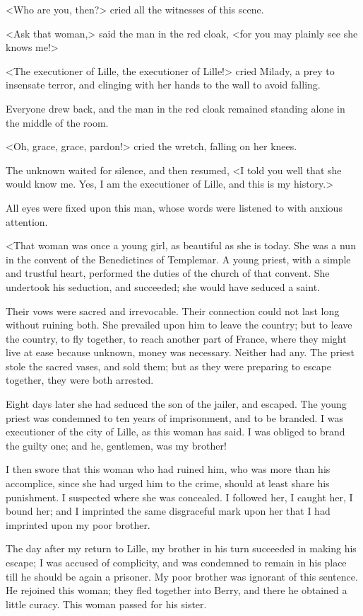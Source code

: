 <Who are you, then?> cried all the witnesses of this scene. 

<Ask that woman,> said the man in the red cloak, <for you may plainly see she knows me!> 

<The executioner of Lille, the executioner of Lille!> cried Milady, a prey to insensate terror, and clinging with her hands to the wall to avoid falling. 

Everyone drew back, and the man in the red cloak remained standing alone in the middle of the room. 

<Oh, grace, grace, pardon!> cried the wretch, falling on her knees. 

The unknown waited for silence, and then resumed, <I told you well that she would know me. Yes, I am the executioner of Lille, and this is my history.> 

All eyes were fixed upon this man, whose words were listened to with anxious attention. 

<That woman was once a young girl, as beautiful as she is today. She was a nun in the convent of the Benedictines of Templemar. A young priest, with a simple and trustful heart, performed the duties of the church of that convent. She undertook his seduction, and succeeded; she would have seduced a saint. 

Their vows were sacred and irrevocable. Their connection could not last long without ruining both. She prevailed upon him to leave the country; but to leave the country, to fly together, to reach another part of France, where they might live at ease because unknown, money was necessary. Neither had any. The priest stole the sacred vases, and sold them; but as they were preparing to escape together, they were both arrested. 

Eight days later she had seduced the son of the jailer, and escaped. The young priest was condemned to ten years of imprisonment, and to be branded. I was executioner of the city of Lille, as this woman has said. I was obliged to brand the guilty one; and he, gentlemen, was my brother! 

I then swore that this woman who had ruined him, who was more than his accomplice, since she had urged him to the crime, should at least share his punishment. I suspected where she was concealed. I followed her, I caught her, I bound her; and I imprinted the same disgraceful mark upon her that I had imprinted upon my poor brother. 

The day after my return to Lille, my brother in his turn succeeded in making his escape; I was accused of complicity, and was condemned to remain in his place till he should be again a prisoner. My poor brother was ignorant of this sentence. He rejoined this woman; they fled together into Berry, and there he obtained a little curacy. This woman passed for his sister. 

